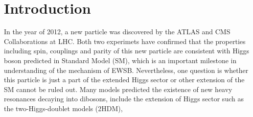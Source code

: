 \section{Introduction}

In the year of 2012, a new particle was discovered by the ATLAS and CMS Collaborations at LHC\cite{20121, 201230}.
Both two experimets have confirmed that the properties including spin, couplings and parity of this new particle are consistent with 
Higgs boson predicted in Standard Model (SM), which is an important milestone in understanding of the mechanism of EWSB.
Nevertheless, one question is whether this particle is just a part of the extended Higgs sector
or other extension of the SM cannot be ruled out.
Many models predicted the existence of new heavy resonances decaying into dibosons, 
include the extension of Higgs sector such as the two-Higgs-doublet models (2HDM)\cite{},
